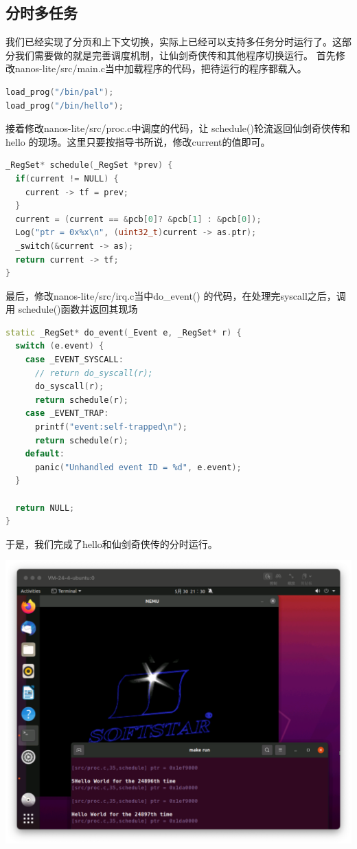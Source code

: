 \documentclass[UTF8,a4paper,10pt]{ctexart}
\begin{document}
\subsection{分时多任务}
我们已经实现了分页和上下文切换，实际上已经可以支持多任务分时运行了。这部分我们需要做的就是完善调度机制，让仙剑奇侠传和其他程序切换运行。
首先修改nanos-lite/src/main.c当中加载程序的代码，把待运行的程序都载入。
\begin{lstlisting}[language = C++]
load_prog("/bin/pal");
load_prog("/bin/hello");
\end{lstlisting}
接着修改nanos-lite/src/proc.c中调度的代码，让 schedule()轮流返回仙剑奇侠传和 hello 的现场。这里只要按指导书所说，修改current的值即可。
\begin{lstlisting}[language = C++]
_RegSet* schedule(_RegSet *prev) {
  if(current != NULL) {
    current -> tf = prev;
  }
  current = (current == &pcb[0]? &pcb[1] : &pcb[0]);
  Log("ptr = 0x%x\n", (uint32_t)current -> as.ptr);
  _switch(&current -> as);
  return current -> tf;
}
\end{lstlisting}
最后，修改nanos-lite/src/irq.c当中do\_event() 的代码，在处理完syscall之后，调用 schedule()函数并返回其现场
\begin{lstlisting}[language=C++]
static _RegSet* do_event(_Event e, _RegSet* r) {
  switch (e.event) {
    case _EVENT_SYSCALL:
      // return do_syscall(r);
      do_syscall(r);
      return schedule(r);
    case _EVENT_TRAP:
      printf("event:self-trapped\n");
      return schedule(r);
    default: 
      panic("Unhandled event ID = %d", e.event);
  }

  return NULL;
}
\end{lstlisting}
于是，我们完成了hello和仙剑奇侠传的分时运行。
\begin{center}
  \includegraphics*[scale = 0.35]{img/11}
\end{center}
\end{document}
